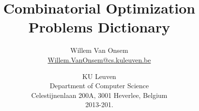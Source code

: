 \documentclass{../SharedData/dictionaryclass}
\title{Combinatorial Optimization Problems Dictionary}
\author{Willem Van Onsem\\\href{mailto:Willem.VanOnsem@cs.kuleuven.be}{Willem.VanOnsem@cs.kuleuven.be}}
\date{KU Leuven\\Department of Computer Science\\Celestijnenlaan 200A, 3001 Heverlee, Belgium\\2013-201.}
\begin{document}
\glsaddall
\printglossaries
\end{document}
